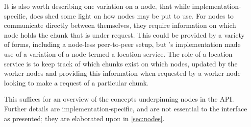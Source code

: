 It is also worth describing one variation on a node, that while implementation-specific, does shed some light on how nodes may be put to use.
For nodes to communicate directly between themselves, they require information on which node holds the chunk that is under request.
This could be provided by a variety of forms, including a node-less peer-to-peer setup, but \lsr{}'s implementation made use of a variation of a node termed a location service.
The role of a location service is to keep track of which chunks exist on which nodes, updated by the worker nodes and providing this information when requested by a worker node looking to make a request of a particular chunk.

This suffices for an overview of the concepts underpinning nodes in the API.
Further details are implementation-specific, and are not essential to the interface as presented; they are elaborated upon in \cref{sec:nodes}.
